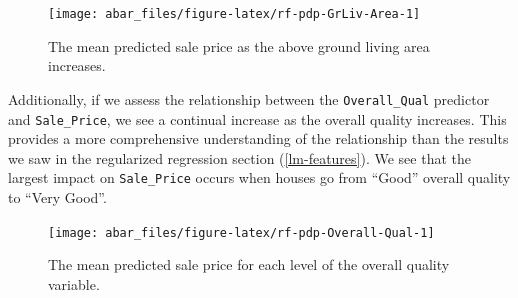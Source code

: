 \documentclass[]{book}
\newenvironment{Shaded}{\begin{snugshade}}{\end{snugshade}}
\newcommand{\CommentTok}[1]{\textcolor[rgb]{0.56,0.35,0.01}{\textit{#1}}}
\newcommand{\DataTypeTok}[1]{\textcolor[rgb]{0.13,0.29,0.53}{#1}}
\newcommand{\DecValTok}[1]{\textcolor[rgb]{0.00,0.00,0.81}{#1}}
\newcommand{\KeywordTok}[1]{\textcolor[rgb]{0.13,0.29,0.53}{\textbf{#1}}}
\newcommand{\NormalTok}[1]{#1}
\newcommand{\OperatorTok}[1]{\textcolor[rgb]{0.81,0.36,0.00}{\textbf{#1}}}
\newcommand{\OtherTok}[1]{\textcolor[rgb]{0.56,0.35,0.01}{#1}}
\newcommand{\StringTok}[1]{\textcolor[rgb]{0.31,0.60,0.02}{#1}}
\theoremstyle{definition}
\theoremstyle{definition}
\theoremstyle{definition}
\theoremstyle{remark}
\begin{document}
\begin{Shaded}
\end{Shaded}

\begin{figure}

{\centering \texttt{[image: abar\_files/figure-latex/rf-pdp-GrLiv-Area-1]} 

}

\caption{The mean predicted sale price as the above ground living area increases.}\label{fig:rf-pdp-GrLiv-Area}
\end{figure}

Additionally, if we assess the relationship between the
\texttt{Overall\_Qual} predictor and \texttt{Sale\_Price}, we see a
continual increase as the overall quality increases. This provides a
more comprehensive understanding of the relationship than the results we
saw in the regularized regression section (\ref{lm-features}). We see
that the largest impact on \texttt{Sale\_Price} occurs when houses go
from ``Good'' overall quality to ``Very Good''.

\begin{Shaded}
\end{Shaded}

\begin{figure}

{\centering \texttt{[image: abar\_files/figure-latex/rf-pdp-Overall-Qual-1]} 

}

\caption{The mean predicted sale price for each level of the overall quality variable.}\label{fig:rf-pdp-Overall-Qual}
\end{figure}
\end{document}
